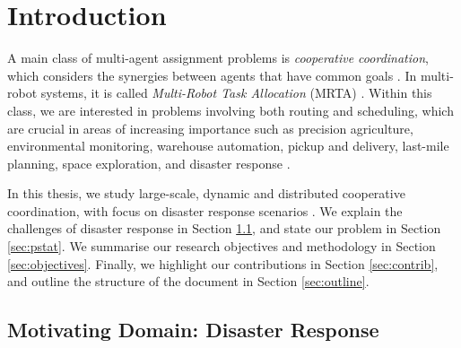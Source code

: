 \chapter{Introduction}\label{chap:intro}

A main class of multi-agent assignment problems is \emph{cooperative coordination}, which
considers the synergies between agents that have common goals \cite{shoham2008mas}. In
multi-robot systems, it is called \emph{Multi-Robot Task Allocation} (MRTA)
\cite{gerkey2004}. Within this class, we are interested in problems involving both routing
and scheduling, which are crucial in areas of increasing importance such as precision
agriculture, environmental monitoring, warehouse automation, pickup and delivery,
last-mile planning, space exploration, and disaster response \cite{nunes2017taxonomy}.

In this thesis, we study large-scale, dynamic and distributed cooperative coordination,
with focus on disaster response scenarios \cite{rcr2001,murphy2014}. We explain the
challenges of disaster response in Section \ref{sec:domain}, and state our problem in
Section \ref{sec:pstat}. We summarise our research objectives and methodology in Section
\ref{sec:objectives}. Finally, we highlight our contributions in Section
\ref{sec:contrib}, and outline the structure of the document in Section \ref{sec:outline}.

\section{Motivating Domain: Disaster Response}\label{sec:domain}

